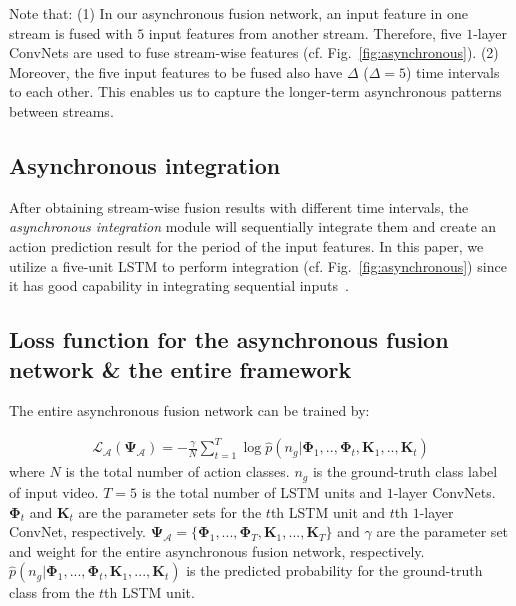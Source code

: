 \documentclass[letterpaper]{article} %
\begin{document}
Note that: (1) In our asynchronous fusion network, an input feature in one stream is fused with $5$ input features from another stream. Therefore, five $1$-layer ConvNets are used to fuse stream-wise features (cf. Fig.~\ref{fig:asynchronous}). (2) Moreover, the five input features to be fused also have $\Delta$ ($\Delta=5$) time intervals to each other. This enables us to capture the longer-term asynchronous patterns between streams.





\subsection{Asynchronous integration}

After obtaining stream-wise fusion results with different time intervals, the \emph{asynchronous integration} module will sequentially integrate them and create an action prediction result for the period of the input features. In this paper, we utilize a five-unit LSTM to perform integration (cf. Fig.~\ref{fig:asynchronous}) since it has good capability in integrating sequential inputs~\cite{LSTM}. %


\subsection{Loss function for the asynchronous fusion network \& the entire framework}

The entire asynchronous fusion network can be trained by:

\begin{equation}
\begin{aligned}
\mathcal{L}_{\mathcal{A}}(\mathbf{\Psi}_\mathcal{A})=-\frac{\gamma}{N} \sum_{t=1}^{T}\log{\hat{p}(n_g|\mathbf{\Phi}_1,..,\mathbf{\Phi}_t,\mathbf{K}_1,..,\mathbf{K}_t)}
\end{aligned}
\label{equation:equ5}
\end{equation}
where $N$ is the total number of action classes. $n_g$ is the ground-truth class label of input video. $T=5$ is the total number of LSTM units and $1$-layer ConvNets. $\mathbf{\Phi}_t$ and $\mathbf{K}_t$ are the parameter sets for the $t$th LSTM unit and $t$th $1$-layer ConvNet, respectively. $\mathbf{\Psi_{\mathcal{A}}}=\{\mathbf{\Phi}_1,...,\mathbf{\Phi}_T,\mathbf{K}_1,...,\mathbf{K}_T\}$ and $\gamma$ are the parameter set and weight for the entire asynchronous fusion network, respectively. $\hat{p}(n_g|\mathbf{\Phi}_1,...,\mathbf{\Phi}_t,\mathbf{K}_1,...,\mathbf{K}_t)$ is the predicted probability for the ground-truth class from the $t$th LSTM unit.
\end{document}
